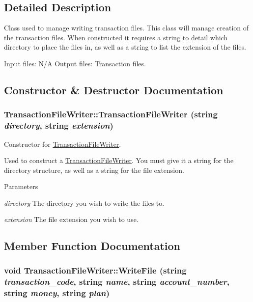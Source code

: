 \subsection{Detailed Description}
Class used to manage writing transaction files. This class will manage creation of the transaction files. When constructed it requires a string to detail which directory to place the files in, as well as a string to list the extension of the files.

Input files: N/A Output files: Transaction files. 

\subsection{Constructor \& Destructor Documentation}
\hypertarget{classTransactionFileWriter_a38805ea13f8ca006b21c48e7707032ed}{
\subsubsection[{TransactionFileWriter}]{\setlength{\rightskip}{0pt plus 5cm}TransactionFileWriter::TransactionFileWriter (string {\em directory}, \/  string {\em extension})}}
\label{classTransactionFileWriter_a38805ea13f8ca006b21c48e7707032ed}


Constructor for \hyperlink{classTransactionFileWriter}{TransactionFileWriter}. 

Used to construct a \hyperlink{classTransactionFileWriter}{TransactionFileWriter}. You must give it a string for the directory structure, as well as a string for the file extension.


\begin{DoxyParams}{Parameters}
\item[{\em directory}]The directory you wish to write the files to.\item[{\em extension}]The file extension you wish to use. \end{DoxyParams}


\subsection{Member Function Documentation}
\hypertarget{classTransactionFileWriter_ad5145cb11609d603ba71addc67c3247a}{
\subsubsection[{WriteFile}]{\setlength{\rightskip}{0pt plus 5cm}void TransactionFileWriter::WriteFile (string {\em transaction\_\-code}, \/  string {\em name}, \/  string {\em account\_\-number}, \/  string {\em money}, \/  string {\em plan})}}
\label{classTransactionFileWriter_ad5145cb11609d603ba71addc67c3247a}


